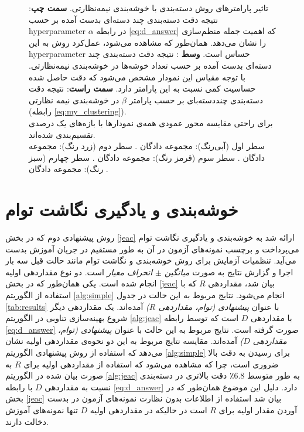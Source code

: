 \begin{figure}[!h]
\begin{subfigure}[b]{0.3\linewidth}
  \end{subfigure}
  \caption[تحلیل پارامترهای روش دسته‌بندی با خوشه‌بندی نیمه‌نظارتی]{
  تاثیر پارامترهای  روش دسته‌بندی با خوشه‌بندی نیمه‌نظارتی.    \textbf{سمت چپ}: نتیجه دقت دسته‌بندی چند دسته‌ای بدست آمده بر حسب \gls{hyperparameter}  $\alpha$ در رابطه
 \eqref{eq:d_answer}
 که اهمیت جمله منظم‌سازی را نشان می‌دهد. همان‌طور که مشاهده می‌شود، عمل‌کرد روش به این \gls{hyperparameter} حساس است.
 \textbf{وسط }:
 نتیجه دقت  دسته‌بندی چند دسته‌ای بدست آمده بر حسب تعداد خوشه‌ها در خوشه‌بندی نیمه‌نظارتی. با توجه مقیاس این نمودار مشخص می‌شود که دقت حاصل شده حساسیت کمی نسبت به این پارامتر دارد.
  \textbf{سمت راست}:
  نتیجه دقت دسته‌بندی چنددسته‌بای بر حسب پارامتر $\beta$ در خوشه‌بندی نیمه نظارتی (رابطه \eqref{eq:my_clustering}).\\
  برای راحتی مقایسه محور عمودی  همه‌ی نمودارها با بازه‌های یک درصدی تقسیم‌بندی شده‌اند.\\
سطر اول (آبی‌رنگ): مجموعه دادگان . سطر دوم (زرد رنگ): مجموعه دادگان . سطر سوم (قرمز رنگ): مجموعه دادگان . سطر چهارم (سبز رنگ): مجموعه دادگان .
 }
  \label{fig:simple_params}
  \end{figure}




\section{ خوشه‌بندی و یادگیری نگاشت توام}\label{exp:jeac}
\label{exp:cluster}
روش پیشنهادی دوم که در بخش \ref{jeac} ارائه شد به خوشه‌بندی و یادگیری نگاشت توام می‌پرداخت و برچسب نمونه‌های آزمون در آن به طور مستقیم در جریان آموزش بدست می‌آید.
تنظمیات آزمایش برای روش خوشه‌بندی و نگاشت توام مانند حالت قبل سه بار اجرا و گزارش نتایج به صورت \textit{ میانگین $\pm$ انحراف معیار } است. دو نوع  مقداردهی اولیه انجام شده است. یکی همان‌طور که در بخش \ref{jeac} بیان شد، مقداردهی $R$ که با استفاده از الگوریتم
\ref{alg:simple}
انجام می‌شود. نتایج مربوط به این حالت در جدول  \ref{tab:results} با عنوان
\textit{ پیشنهادی (توام، مقداردهی $R$)}
آمده‌اند. یک مقداردهی دیگر شروع بهینه‌سازی تناوبی در الگوریتم
\ref{alg:jeac}
 با مقداردهی $D$ است که توسط رابطه
\eqref{eq:d_answer}
صورت گرفته است. نتایج مربوط به این حالت با عنوان
\textit{پیشنهادی (توام، مقداردهی $D$)}
آمده‌اند. مقایسه نتایج مربوط به این دو نحوه‌ی مقداردهی اولیه نشان می‌دهد که استفاده از روش پیشنهادی الگوریتم \ref{alg:simple}  برای رسیدن به دقت بالا ضروری است، چرا که مشاهده می‌شود که استفاده از مقداردهی اولیه برای $R$ به صورت بیان شده در الگوریتم \ref{alg:jeac} به طور متوسط $6.8$٪ دقت بالاتری در دسته‌بندی نسبت به مقداردهی $D$  با رابطه \eqref{eq:d_answer} دارد. دلیل این موضوع همان‌طور که در بخش \ref{jeac} بیان شد استفاده از اطلاعات بدون نظارت نمونه‌های آزمون در بدست آوردن مقدار اولیه برای $R$ است در حالیکه در مقداردهی اولیه $D$ تنها نمونه‌های آموزش دخالت دارند.


